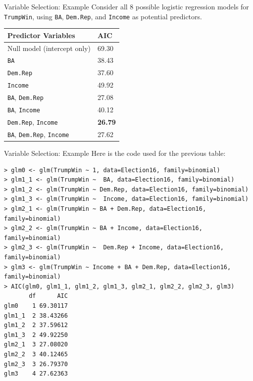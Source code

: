 \documentclass[10pt]{beamer}\usepackage[]{graphicx}\usepackage[]{color}
\begin{document}
\begin{frame}{Variable Selection: Example}
Consider all 8 possible logistic regression models for \texttt{TrumpWin}, using \texttt{BA}, \texttt{Dem.Rep}, and \texttt{Income} as potential predictors.
\begin{table}
\begin{tabular}{l|l}
Predictor Variables & AIC\\
\hline
Null model (intercept only) & 69.30\\
\texttt{BA} & 38.43\\
\texttt{Dem.Rep} & 37.60\\
\texttt{Income} & 49.92\\
\texttt{BA}, \texttt{Dem.Rep} & 27.08\\
\texttt{BA}, \texttt{Income} & 40.12\\
\texttt{Dem.Rep}, \texttt{Income} & \textbf{26.79}\\
\texttt{BA}, \texttt{Dem.Rep}, \texttt{Income} & 27.62\\
\end{tabular}
\end{table}
\end{frame}

\begin{frame}[fragile]{Variable Selection: Example}
Here is the code used for the previous table:
\scriptsize
\begin{verbatim}
> glm0 <- glm(TrumpWin ~ 1, data=Election16, family=binomial)
> glm1_1 <- glm(TrumpWin ~  BA, data=Election16, family=binomial)
> glm1_2 <- glm(TrumpWin ~ Dem.Rep, data=Election16, family=binomial)
> glm1_3 <- glm(TrumpWin ~  Income, data=Election16, family=binomial)
> glm2_1 <- glm(TrumpWin ~ BA + Dem.Rep, data=Election16, family=binomial)
> glm2_2 <- glm(TrumpWin ~ BA + Income, data=Election16, family=binomial)
> glm2_3 <- glm(TrumpWin ~  Dem.Rep + Income, data=Election16, family=binomial) 
> glm3 <- glm(TrumpWin ~ Income + BA + Dem.Rep, data=Election16, family=binomial)
> AIC(glm0, glm1_1, glm1_2, glm1_3, glm2_1, glm2_2, glm2_3, glm3)
       df      AIC
glm0    1 69.30117
glm1_1  2 38.43266
glm1_2  2 37.59612
glm1_3  2 49.92250
glm2_1  3 27.08020
glm2_2  3 40.12465
glm2_3  3 26.79370
glm3    4 27.62363
\end{verbatim}
\end{frame}
\end{document}
